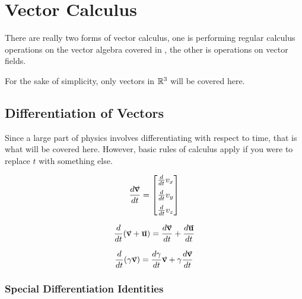 \documentclass[main.tex]{subfiles}
\begin{document}

    \chapter{Vector Calculus}
        \label{ch: Vector Calculus}
        \thispagestyle{noheader}
        
        There are really two forms of vector calculus, one is performing regular calculus operations on the vector algebra covered in , the other is operations on vector fields.

        For the sake of simplicity, only vectors in $\mathbb{R}^3$ will be covered here.


        \section{Differentiation of Vectors}
            \label{sec: Differentiation of Vectors}

            Since a large part of physics involves differentiating with respect to time, that is what will be covered here. However, basic rules of calculus apply if you were to replace $t$ with something else.

            \begin{equation}
                \frac{d\vect{v}}{dt} = \Matrix{\frac{d}{dt} v_x \vspace{2mm}\\ \frac{d}{dt} v_y\vspace{2mm}\\ \frac{d}{dt} v_z}
            \end{equation}

            \begin{equation}
                \frac{d}{dt}(\vect{v} + \vect{u}) = \frac{d\vect{v}}{dt}  + \frac{d\vect{u}}{dt}
            \end{equation}

            \begin{equation}
                \frac{d}{dt}(\gamma\vect{v}) = \frac{d\gamma}{dt}\vect{v} + \gamma \frac{d\vect{v}}{dt}
            \end{equation}



            \subsection{Special Differentiation Identities}
                \label{subsec: Special Vector Differentiation Identities}
\end{document}
